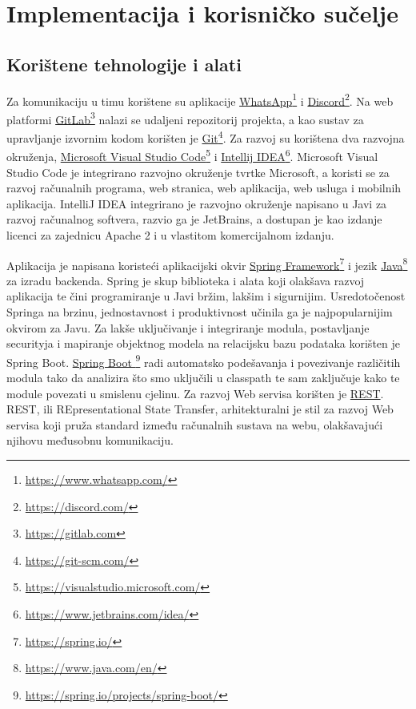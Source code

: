 \chapter{Implementacija i korisničko sučelje}


\section{Korištene tehnologije i alati}

Za komunikaciju u timu korištene su aplikacije \underline{WhatsApp}\footnote{\url{https://www.whatsapp.com/}} i \underline{Discord}\footnote{\url{https://discord.com/}}. Na web platformi \underline{GitLab}\footnote{\url{https://gitlab.com}} nalazi se udaljeni repozitorij projekta, a kao sustav za upravljanje izvornim kodom korišten je \underline{Git}\footnote{\url{https://git-scm.com/}}. Za razvoj su korištena dva razvojna okruženja, \underline{Microsoft Visual Studio Code}\footnote{\url{https://visualstudio.microsoft.com/}} i \underline{Intellij IDEA}\footnote{\url{https://www.jetbrains.com/idea/}}. Microsoft Visual Studio Code je integrirano razvojno okruženje tvrtke Microsoft, a koristi se za razvoj računalnih programa, web stranica, web aplikacija, web usluga i mobilnih aplikacija. IntelliJ IDEA integrirano je razvojno okruženje napisano u Javi za razvoj računalnog softvera, razvio ga je JetBrains, a dostupan je kao izdanje licenci za zajednicu Apache 2 i u vlastitom komercijalnom izdanju. \par		
Aplikacija je napisana koristeći aplikacijski okvir \underline{Spring Framework}\footnote{\url{https://spring.io/}} i jezik \underline{Java}\footnote{\url{https://www.java.com/en/}} za izradu backenda. Spring je skup biblioteka i alata koji olakšava razvoj aplikacija te čini programiranje u Javi bržim, lakšim i sigurnijim. Usredotočenost Springa na brzinu, jednostavnost i produktivnost učinila ga je najpopularnijim okvirom za Javu. Za lakše uključivanje i integriranje modula, postavljanje securityja i mapiranje objektnog modela na relacijsku bazu podataka korišten je Spring Boot. \underline{Spring Boot  }\footnote{\url{https://spring.io/projects/spring-boot/}} radi automatsko podešavanja i povezivanje različitih modula tako da analizira što smo uključili u classpath te sam zaključuje kako te module povezati u smislenu cjelinu. Za razvoj Web servisa korišten je \underline{REST}. REST, ili REpresentational State Transfer, arhitekturalni je stil za razvoj Web servisa koji pruža standard između računalnih sustava na webu, olakšavajući njihovu međusobnu komunikaciju. \par
